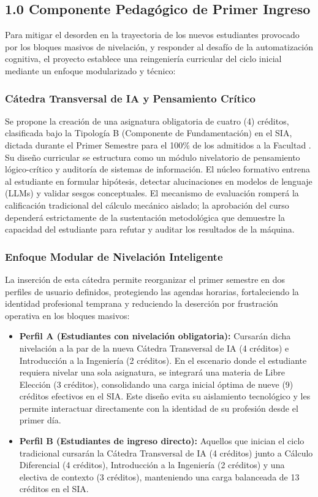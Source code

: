 \documentclass[journal,10pt,twocolumn,letterpaper]{IEEEtran}
\begin{document}
\subsection{1.0 Componente Pedagógico de Primer Ingreso}
Para mitigar el desorden en la trayectoria de los nuevos estudiantes provocado por los bloques masivos de nivelación, y responder al desafío de la automatización cognitiva, el proyecto establece una reingeniería curricular del ciclo inicial mediante un enfoque modularizado y técnico:

\subsubsection{Cátedra Transversal de IA y Pensamiento Crítico}
Se propone la creación de una asignatura obligatoria de cuatro (4) créditos, clasificada bajo la Tipología B (Componente de Fundamentación) en el SIA, dictada durante el Primer Semestre para el 100\% de los admitidos a la Facultad \cite{unal_acuerdo033}. Su diseño curricular se estructura como un módulo nivelatorio de pensamiento lógico-crítico y auditoría de sistemas de información. El núcleo formativo entrena al estudiante en formular hipótesis, detectar alucinaciones en modelos de lenguaje (LLMs) y validar sesgos conceptuales. El mecanismo de evaluación romperá la calificación tradicional del cálculo mecánico aislado; la aprobación del curso dependerá estrictamente de la sustentación metodológica que demuestre la capacidad del estudiante para refutar y auditar los resultados de la máquina.

\subsubsection{Enfoque Modular de Nivelación Inteligente}
La inserción de esta cátedra permite reorganizar el primer semestre en dos perfiles de usuario definidos, protegiendo las agendas horarias, fortaleciendo la identidad profesional temprana y reduciendo la deserción por frustración operativa en los bloques masivos:
\begin{itemize}
    \item \textbf{Perfil A (Estudiantes con nivelación obligatoria):} Cursarán dicha nivelación a la par de la nueva Cátedra Transversal de IA (4 créditos) e Introducción a la Ingeniería (2 créditos). En el escenario donde el estudiante requiera nivelar una sola asignatura, se integrará una materia de Libre Elección (3 créditos), consolidando una carga inicial óptima de nueve (9) créditos efectivos en el SIA. Este diseño evita su aislamiento tecnológico y les permite interactuar directamente con la identidad de su profesión desde el primer día.
    \item \textbf{Perfil B (Estudiantes de ingreso directo):} Aquellos que inician el ciclo tradicional cursarán la Cátedra Transversal de IA (4 créditos) junto a Cálculo Diferencial (4 créditos), Introducción a la Ingeniería (2 créditos) y una electiva de contexto (3 créditos), manteniendo una carga balanceada de 13 créditos en el SIA.
\end{itemize}
\end{document}
